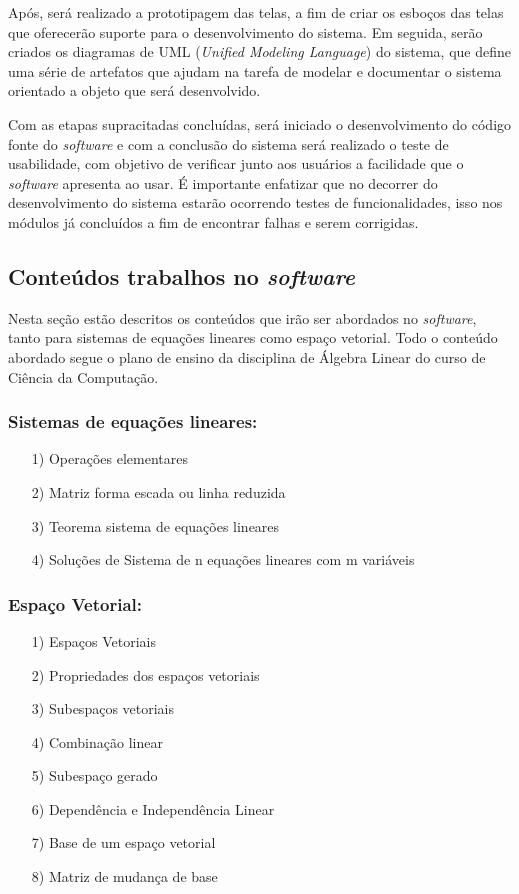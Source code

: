 Após, será realizado a prototipagem das telas, a fim de criar os esboços das telas que oferecerão suporte para o desenvolvimento do sistema. Em seguida, serão criados os diagramas de UML (\textit{Unified Modeling Language}) do sistema, que define uma série de artefatos que ajudam na tarefa de modelar e documentar o sistema orientado a objeto que será desenvolvido.

Com as etapas supracitadas concluídas, será iniciado o desenvolvimento do código fonte do \textit{software} e com a conclusão do sistema será realizado o teste de usabilidade, com objetivo de verificar junto aos usuários a facilidade que o \textit{software} apresenta ao usar. É importante enfatizar que no decorrer do desenvolvimento do sistema estarão ocorrendo testes de funcionalidades, isso nos módulos já concluídos a fim de encontrar falhas e serem corrigidas.

\subsection{Conteúdos trabalhos no \textit{software}}
\noindent Nesta seção estão descritos os conteúdos que irão ser abordados no \textit{software}, tanto para sistemas de equações lineares como espaço vetorial. Todo o conteúdo abordado segue o plano de ensino da disciplina de Álgebra Linear do curso de Ciência da Computação.  

\subsubsection{Sistemas de equações lineares:}
\begin{itemize}
    \item[1)] Operações elementares
    \item[2)] Matriz forma escada ou linha reduzida
    \item[3)] Teorema sistema de equações lineares
    \item[4)] Soluções de Sistema de n equações lineares com m variáveis
\end{itemize}

\subsubsection{Espaço Vetorial:} 
\begin{itemize}
    \item[1)] Espaços Vetoriais
    \item[2)] Propriedades dos espaços vetoriais
    \item[3)] Subespaços vetoriais
    \item[4)] Combinação linear
    \item[5)] Subespaço gerado
    \item[6)] Dependência e Independência Linear
    \item[7)] Base de um espaço vetorial
    \item[8)] Matriz de mudança de base
\end{itemize}

